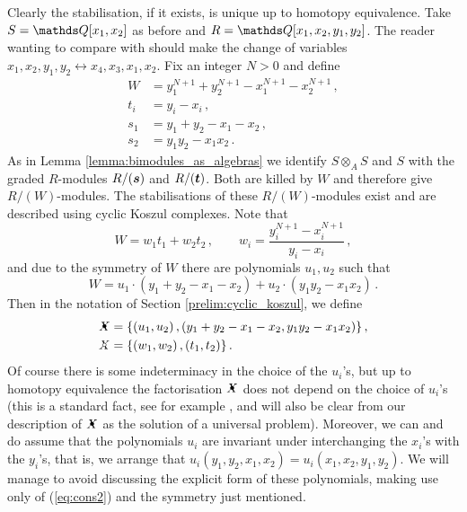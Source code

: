 \documentclass{compositio}
\theoremstyle{definition}
\numberwithin{equation}{section}
\begin{document}
Clearly the stabilisation, if it exists, is unique up to homotopy equivalence. Take $S = \QQ[x_1,x_2]$ as before and $R = \QQ[x_1,x_2,y_1,y_2]$. The reader wanting to compare with \cite[Section 6]{kr0401268} should make the change of variables $x_1,x_2,y_1,y_2 \longleftrightarrow x_4,x_3,x_1,x_2$. Fix an integer $N > 0$ and define
\begin{align*}
W &= y_1^{N+1} + y_2^{N+1} - x_1^{N+1} - x_2^{N+1}\,,\\
t_i &= y_i - x_i\,,\\
s_1 &= y_1 + y_2 - x_1 - x_2\,,\\
s_2 &= y_1 y_2 - x_1 x_2\,.
\end{align*}
As in Lemma \ref{lemma:bimodules_as_algebras} we identify $S \otimes_A S$ and $S$ with the graded $R$-modules $R/(\boldsymbol{s})$ and $R/(\boldsymbol{t})$. Both are killed by $W$ and therefore give $R/(W)$-modules. The stabilisations of these $R/(W)$-modules exist and are described using cyclic Koszul complexes. Note that
\begin{equation}\label{eq:cons1}
W = w_1 t_1 + w_2 t_2 \, , \qquad w_i = \frac{y_i^{N+1} - x_i^{N+1}}{y_i - x_i} \, ,
\end{equation}
and due to the symmetry of $W$ there are polynomials $u_1,u_2$ such that
\begin{equation}\label{eq:cons2}
W = u_1 \cdot ( y_1 + y_2 - x_1 - x_2 ) + u_2 \cdot ( y_1 y_2 - x_1 x_2 ) \, .
\end{equation}
Then in the notation of Section \ref{prelim:cyclic_koszul}, we define
\begin{align}
\Xbul &= \{ (u_1, u_2)\, , (y_1 + y_2 - x_1 - x_2, y_1 y_2 - x_1 x_2) \} \, , \nonumber \\
\Xcirc &= \{ (w_1, w_2) \, , (t_1, t_2) \}\,. \label{XbulXcirc}
\end{align}
Of course there is some indeterminacy in the choice of the $u_i$'s, but up to homotopy equivalence the factorisation $\Xbul$ does not depend on the choice of $u_i$'s (this is a standard fact, see for example \cite{??}, and will also be clear from our description of $\Xbul$ as the solution of a universal problem). Moreover, we can and do assume that the polynomials $u_i$ are invariant under interchanging the $x_{i}$'s with the $y_{i}$'s, that is, we arrange that $u_i(y_1,y_2,x_1,x_2) = u_i(x_1,x_2,y_1,y_2)$. We will manage to avoid discussing the explicit form of these polynomials, making use only of (\ref{eq:cons2}) and the symmetry just mentioned.
\end{document}
